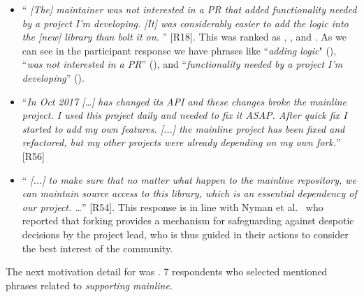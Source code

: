 \begin{itemize}[leftmargin=*]

\item ``\emph{%
[The] maintainer %
was not interested in a PR that added functionality needed by a project I'm developing. [It] was considerably easier to add the logic into the [new] library than bolt it on.%
}'' [R18]. This was ranked as , , and . As we can see in the participant response we have phrases like ``\textit{adding logic}" (), ``\textit{was not interested in a PR}'' (), and ``\textit{functionality needed by a project I'm developing}'' ().

\item ``\emph{In Oct 2017 [\ldots] %
has changed its API and these changes broke the mainline project. I used this project daily and needed to fix it ASAP. After quick fix I started to add my own features. [...] the mainline project has been fixed and refactored, but my other projects were already depending on my own fork.}'' [R56]

\item ``\emph{%
[...] to make sure that no matter what happen to the mainline repository, we can maintain source access to this library, which is an essential dependency of our project. \ldots}'' [R54]. This response is in line with Nyman et al.~\cite{Linus:2012Perspectives} who reported that forking provides a mechanism for safeguarding against despotic decisions by the project lead, who is thus guided in their actions to consider the best interest of the community.

\end{itemize}

\nd The next motivation detail for   was .
7 respondents who selected  mentioned phrases related to \emph{supporting mainline}.

